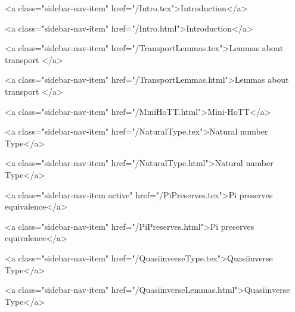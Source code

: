       
    
      
        
          <a class="sidebar-nav-item" href="/Intro.tex">Introduction</a>
        
      
    
      
        
          <a class="sidebar-nav-item" href="/Intro.html">Introduction</a>
        
      
    
      
        
          <a class="sidebar-nav-item" href="/TransportLemmas.tex">Lemmas about transport </a>
        
      
    
      
        
          <a class="sidebar-nav-item" href="/TransportLemmas.html">Lemmas about transport </a>
        
      
    
      
        
          <a class="sidebar-nav-item" href="/MiniHoTT.html">Mini-HoTT</a>
        
      
    
      
        
          <a class="sidebar-nav-item" href="/NaturalType.tex">Natural number Type</a>
        
      
    
      
        
          <a class="sidebar-nav-item" href="/NaturalType.html">Natural number Type</a>
        
      
    
      
        
          <a class="sidebar-nav-item active" href="/PiPreserves.tex">Pi preserves equivalence</a>
        
      
    
      
        
          <a class="sidebar-nav-item" href="/PiPreserves.html">Pi preserves equivalence</a>
        
      
    
      
        
          <a class="sidebar-nav-item" href="/QuasiinverseType.tex">Quasiinverse Type</a>
        
      
    
      
        
          <a class="sidebar-nav-item" href="/QuasiinverseLemmas.html">Quasiinverse Type</a>
        
